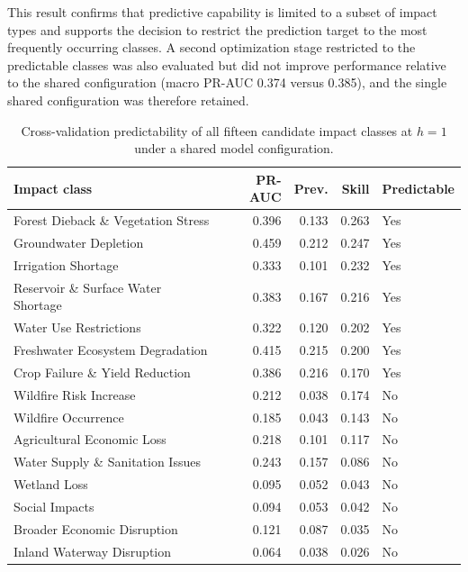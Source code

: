This result confirms that predictive capability is limited to a subset of
impact types and supports the decision to restrict the prediction target to the
most frequently occurring classes. A second optimization stage restricted to
the predictable classes was also evaluated but did not improve performance
relative to the shared configuration (macro PR-AUC 0.374 versus 0.385), and the
single shared configuration was therefore retained.

\begin{table}[h]
\centering
\small
\caption{Cross-validation predictability of all fifteen candidate impact classes at $h=1$ under a shared model configuration.}
\label{tab:predictability}
\begin{tabular}{p{6.2cm} rrrl}
\toprule
\textbf{Impact class} & \textbf{PR-AUC} & \textbf{Prev.} & \textbf{Skill} & \textbf{Predictable} \\
\midrule
Forest Dieback \& Vegetation Stress & 0.396 & 0.133 & 0.263 & Yes \\
Groundwater Depletion               & 0.459 & 0.212 & 0.247 & Yes \\
Irrigation Shortage                 & 0.333 & 0.101 & 0.232 & Yes \\
Reservoir \& Surface Water Shortage & 0.383 & 0.167 & 0.216 & Yes \\
Water Use Restrictions              & 0.322 & 0.120 & 0.202 & Yes \\
Freshwater Ecosystem Degradation    & 0.415 & 0.215 & 0.200 & Yes \\
Crop Failure \& Yield Reduction     & 0.386 & 0.216 & 0.170 & Yes \\
\midrule
Wildfire Risk Increase              & 0.212 & 0.038 & 0.174 & No \\
Wildfire Occurrence                 & 0.185 & 0.043 & 0.143 & No \\
Agricultural Economic Loss          & 0.218 & 0.101 & 0.117 & No \\
Water Supply \& Sanitation Issues   & 0.243 & 0.157 & 0.086 & No \\
Wetland Loss                        & 0.095 & 0.052 & 0.043 & No \\
Social Impacts                      & 0.094 & 0.053 & 0.042 & No \\
Broader Economic Disruption         & 0.121 & 0.087 & 0.035 & No \\
Inland Waterway Disruption          & 0.064 & 0.038 & 0.026 & No \\
\bottomrule
\end{tabular}
\end{table}